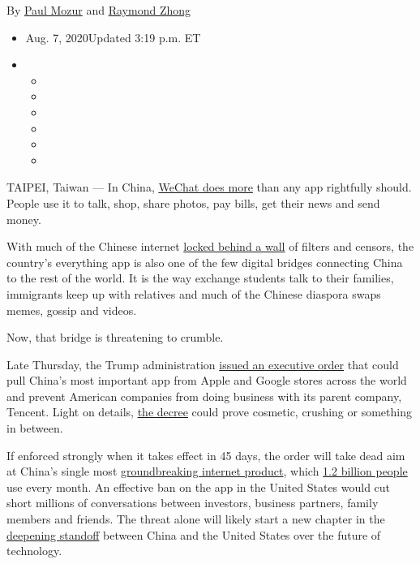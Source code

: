 By \href{https://www.nytimes3xbfgragh.onion/by/paul-mozur}{Paul Mozur}
and \href{https://www.nytimes3xbfgragh.onion/by/raymond-zhong}{Raymond
Zhong}

\begin{itemize}
\item
  Aug. 7, 2020Updated 3:19 p.m. ET
\item
  \begin{itemize}
  \item
  \item
  \item
  \item
  \item
  \item
  \end{itemize}
\end{itemize}

TAIPEI, Taiwan --- In China,
\href{https://www.nytimes3xbfgragh.onion/video/technology/100000004574648/china-internet-wechat.html}{WeChat
does more} than any app rightfully should. People use it to talk, shop,
share photos, pay bills, get their news and send money.

With much of the Chinese internet
\href{https://www.nytimes3xbfgragh.onion/2014/09/22/business/international/china-clamps-down-on-web-pinching-companies-like-google.html}{locked
behind a wall} of filters and censors, the country's everything app is
also one of the few digital bridges connecting China to the rest of the
world. It is the way exchange students talk to their families,
immigrants keep up with relatives and much of the Chinese diaspora swaps
memes, gossip and videos.

Now, that bridge is threatening to crumble.

Late Thursday, the Trump administration
\href{https://www.nytimes3xbfgragh.onion/2020/08/06/technology/trump-wechat-tiktok-china.html?smid=tw-share}{issued
an executive order} that could pull China's most important app from
Apple and Google stores across the world and prevent American companies
from doing business with its parent company, Tencent. Light on details,
\href{https://www.whitehouse.gov/presidential-actions/executive-order-addressing-threat-posed-wechat/}{the
decree} could prove cosmetic, crushing or something in between.

If enforced strongly when it takes effect in 45 days, the order will
take dead aim at China's single most
\href{https://www.nytimes3xbfgragh.onion/2017/07/16/business/china-cash-smartphone-payments.html}{groundbreaking
internet product}, which
\href{https://mp.weixin.qq.com/s/IH09J0CGOJqaYHFWXC4fNw}{1.2 billion
people} use every month. An effective ban on the app in the United
States would cut short millions of conversations between investors,
business partners, family members and friends. The threat alone will
likely start a new chapter in the
\href{https://www.nytimes3xbfgragh.onion/2020/07/14/world/asia/cold-war-china-us.html}{deepening
standoff} between China and the United States over the future of
technology.

